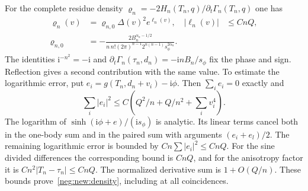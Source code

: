 \documentclass[11pt]{article}
\numberwithin{equation}{section}
\theoremstyle{definition}
\newcommand{\ii}{\mathrm i}
\begin{document}
For the complete residue density
$\varrho_n=-2H_n(T_n,q)/\partial_t\Gamma_n(T_n,q)$ one has
\begin{align}
 \varrho_n(v)&=\varrho_{n,0}\Delta(v)^2e^{\ell_n(v)},
 &|\ell_n(v)|&\le CnQ,\label{neg:new:density}\\
 \varrho_{n,0}&=-\frac{2B_n^{\alpha_n-1/2}}
 {n\,n!(2\pi)^{n-1}2^{n(n-1)}s_\phi^{2\alpha_n}}.      \label{neg:new:residue}
\end{align}
The identities $\ii^{-n^2}=-\ii$ and
$\partial_t\Gamma_n(\tau_n,d_n)=-\ii nB_n/s_\phi$ fix the
phase and sign.  Reflection gives a second contribution with the same
value.  To estimate the logarithmic error, put $e_i=g(T_n,d_n+v_i)-\ii\phi$.
Then $\sum_i e_i=0$ exactly and
\[
 \sum_i|e_i|^2\le C(Q^2/n+Q/n^2+\sum_i v_i^4).
\]
The logarithm of $\sinh(\ii\phi+e)/(\ii s_\phi)$ is analytic.
Its linear terms cancel both in the one-body sum and in the paired
sum with arguments $(e_i+e_l)/2$. The remaining logarithmic error
is bounded by $Cn\sum|e_i|^2\le CnQ$. For the sine divided differences
the corresponding bound is $CnQ$, and for the anisotropy factor it is
$Cn^2|T_n-\tau_n|\le CnQ$. The normalized derivative sum is $1+O(Q/n)$.
These bounds
prove~\eqref{neg:new:density}, including at all coincidences.
\end{document}
